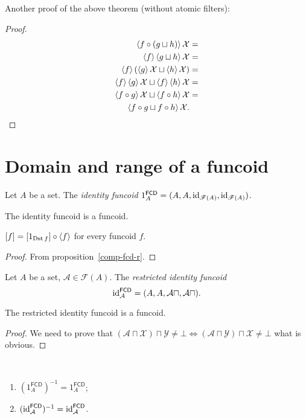 Another proof of the above theorem (without atomic filters):
\begin{proof}
~
\begin{align*}
\left\langle f\circ(g\sqcup h)\right\rangle\mathcal{X} & =\\
\left\langle f\right\rangle\left\langle g\sqcup h\right\rangle\mathcal{X} & =\\
\left\langle f\right\rangle(\left\langle g\right\rangle\mathcal{X}\sqcup\left\langle h\right\rangle\mathcal{X}) & =\\
\left\langle f\right\rangle\left\langle g\right\rangle\mathcal{X}\sqcup\left\langle f\right\rangle\left\langle h\right\rangle\mathcal{X} & =\\
\left\langle f\circ g\right\rangle\mathcal{X}\sqcup\left\langle f\circ h\right\rangle\mathcal{X} & =\\
\left\langle f\circ g\sqcup f\circ h\right\rangle\mathcal{X}.
\end{align*}

\end{proof}

\section{Domain and range of a funcoid}
\begin{defn}
Let $A$ be a set. The \emph{identity funcoid}
$1_{A}^{\mathsf{FCD}}=(A,A,\operatorname{id}_{\mathscr{F}(A)},\operatorname{id}_{\mathscr{F}(A)})$.
\end{defn}
\begin{obvious}
The identity funcoid is a funcoid.\end{obvious}
\begin{prop}
$\mathord{\mathrel{\left[f\right]}}=\mathord{\mathrel{\left[1_{\operatorname{Dst} f}\right]}}\circ\left\langle f\right\rangle$
for every funcoid $f$.\end{prop}
\begin{proof}
From proposition~\ref{comp-fcd-r}.\end{proof}
\begin{defn}
Let $A$ be a set,
$\mathcal{A}\in\mathscr{F}(A)$.
The \emph{restricted identity funcoid
\[
\operatorname{id}_{\mathcal{A}}^{\mathsf{FCD}}=(A,A,\mathcal{A}\sqcap,\mathcal{A}\sqcap).
\]
}\end{defn}
\begin{prop}
The restricted identity funcoid is a funcoid.\end{prop}
\begin{proof}
We need to prove that
$(\mathcal{A}\sqcap\mathcal{X})\sqcap\mathcal{Y}\ne\bot
\Leftrightarrow(\mathcal{A}\sqcap\mathcal{Y})\sqcap\mathcal{X}\ne\bot$
what is obvious.\end{proof}
\begin{obvious}
~
\begin{enumerate}
\item $(1_{A}^{\mathsf{FCD}})^{-1}=1_{A}^{\mathsf{FCD}}$;
\item
$(\operatorname{id}_{\mathcal{A}}^{\mathsf{FCD}})^{-1}=\operatorname{id}_{\mathcal{A}}^{\mathsf{FCD}}$.
\end{enumerate}
\end{obvious}

